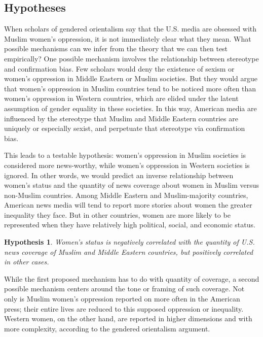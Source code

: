 \documentclass[11pt, oneside]{article}
\newtheorem{hypothesis}{Hypothesis}
\begin{document}
\subsection{Hypotheses}

When scholars of gendered orientalism say that the U.S. media are obsessed with Muslim women's oppression, it is not immediately clear what they mean. What possible mechanisms can we infer from the theory that we can then test empirically? One possible mechanism involves the relationship between stereotype and confirmation bias. Few scholars would deny the existence of sexism or women's oppression in Middle Eastern or Muslim societies. But they would argue that women's oppression in Muslim countries tend to be noticed more often than women's oppression in Western countries, which are elided under the latent assumption of gender equality in these societies. In this way, American media are influenced by the stereotype that Muslim and Middle Eastern countries are uniquely or especially sexist, and perpetuate that stereotype via confirmation bias. 

This leads to a testable hypothesis: women's oppression in Muslim societies is considered more news-worthy, while women's oppression in Western societies is ignored. In other words, we would predict an inverse relationship between women's status and the quantity of news coverage about women in Muslim versus non-Muslim countries. Among Middle Eastern and Muslim-majority countries, American news media will tend to report more stories about women the greater inequality they face. But in other countries, women are more likely to be represented when they have relatively high political, social, and economic status. 

\begin{hypothesis}
Women's status is negatively correlated with the quantity of U.S. news coverage of Muslim and Middle Eastern countries, but positively correlated in other cases.
\end{hypothesis}

While the first proposed mechanism has to do with quantity of coverage, a second possible mechanism centers around the tone or framing of such coverage. Not only is Muslim women's oppression reported on more often in the American press; their entire lives are reduced to this supposed oppression or inequality. Western women, on the other hand, are reported in higher dimensions and with more complexity, according to the gendered orientalism argument.
\end{document}
